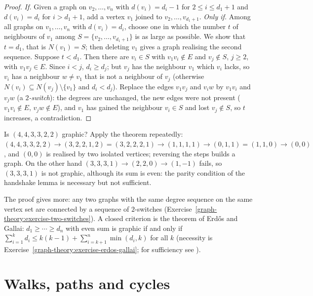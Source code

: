 \begin{proof}
\emph{If.} Given a graph on $v_2, \ldots, v_n$ with $d(v_i) = d_i - 1$ for $2 \leq i \leq d_1 + 1$ and $d(v_i) = d_i$ for $i > d_1 + 1$, add a vertex $v_1$ joined to $v_2, \ldots, v_{d_1+1}$.
\emph{Only if.} Among all graphs on $v_1, \ldots, v_n$ with $d(v_i) = d_i$, choose one in which the number $t$ of neighbours of $v_1$ among $S = \{v_2, \ldots, v_{d_1+1}\}$ is as large as
possible. We show that $t = d_1$, that is $N(v_1) = S$; then deleting $v_1$ gives a graph realising the second sequence. Suppose $t < d_1$. Then there are $v_i \in S$ with $v_1v_i \notin E$
and $v_j \notin S$, $j \geq 2$, with $v_1v_j \in E$. Since $i < j$, $d_i \geq d_j$; but $v_j$ has the neighbour $v_1$ which $v_i$ lacks, so $v_i$ has a neighbour $w \neq v_1$ that is not a
neighbour of $v_j$ (otherwise $N(v_i) \subseteq N(v_j) \setminus \{v_1\}$ and $d_i < d_j$). Replace the edges $v_1v_j$ and $v_iw$ by $v_1v_i$ and $v_jw$ (a \emph{$2$-switch}): the degrees are
unchanged, the new edges were not present ($v_1v_i \notin E$, $v_jw \notin E$), and $v_1$ has gained the neighbour $v_i \in S$ and lost $v_j \notin S$, so $t$ increases, a contradiction.
\end{proof}

\begin{example}\label{graph-theory:example-havel-hakimi}
Is $(4, 4, 3, 3, 2, 2)$ graphic? Apply the theorem repeatedly: $(4, 4, 3, 3, 2, 2) \to (3, 2, 2, 1, 2) = (3, 2, 2, 2, 1) \to (1, 1, 1, 1) \to (0, 1, 1) = (1, 1, 0) \to (0, 0)$, and
$(0, 0)$ is realised by two isolated vertices; reversing the steps builds a graph. On the other hand $(3, 3, 3, 1) \to (2, 2, 0) \to (1, -1)$ fails, so $(3, 3, 3, 1)$ is not graphic, although its
sum is even: the parity condition of the handshake lemma is necessary but not sufficient.
\end{example}

The proof gives more: any two graphs with the same degree sequence on the same vertex set are connected by a sequence of $2$-switches (Exercise~\ref{graph-theory:exercise-two-switches}).
A closed criterion is the theorem of Erd\H{o}s and Gallai: $d_1 \geq \cdots \geq d_n$ with even sum is graphic if and only if $\sum_{i=1}^{k}d_i \leq k(k - 1) + \sum_{i=k+1}^{n}\min(d_i, k)$ for
all $k$ (necessity is Exercise~\ref{graph-theory:exercise-erdos-gallai}; for sufficiency see \cite[Section~3.1]{west-graph-theory}).

\section{Walks, paths and cycles}\label{graph-theory:section-paths}

